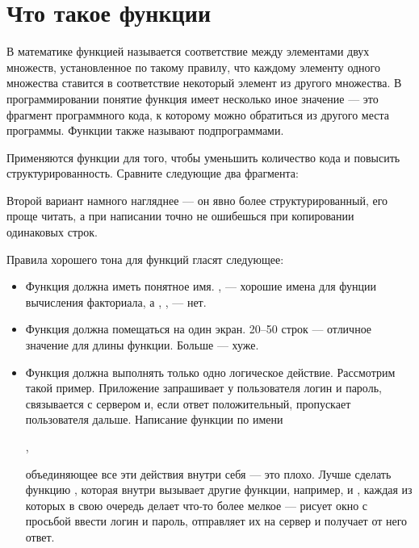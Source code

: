 \documentclass[book.tex]{subfiles}
\begin{document}



\maketitle

\section*{Что такое функции}

В математике функцией называется соответствие между элементами двух множеств, установленное по такому правилу, что каждому элементу одного множества ставится в соответствие некоторый элемент из другого множества. В программировании понятие функция имеет несколько иное значение --- это фрагмент программного кода, к которому можно обратиться из другого места программы. Функции также называют подпрограммами.

Применяются функции для того, чтобы уменьшить количество кода и повысить структурированность. Сравните следующие два фрагмента:



Второй вариант намного нагляднее --- он явно более структурированный, его проще читать, а при написании точно не ошибешься при копировании одинаковых строк.

Правила хорошего тона для функций гласят следующее:

\begin{itemize}
\item Функция должна иметь понятное имя. ,  --- хорошие имена для фунции вычисления факториала, а , ,  --- нет.
\item Функция должна помещаться на один экран. 20--50 строк --- отличное значение для длины функции. Больше --- хуже.
\item Функция должна выполнять только одно логическое действие. Рассмотрим такой пример. Приложение запрашивает у пользователя логин и пароль, связывается с сервером и, если ответ положительный, пропускает пользователя дальше. Написание функции по имени 

, 

объединяющее все эти действия внутри себя --- это плохо. Лучше сделать функцию , которая внутри вызывает другие функции, например,  и , каждая из которых в свою очередь делает что-то более мелкое --- рисует окно с просьбой ввести логин и пароль, отправляет их на сервер и получает от него ответ.
\end{itemize}
\end{document}
